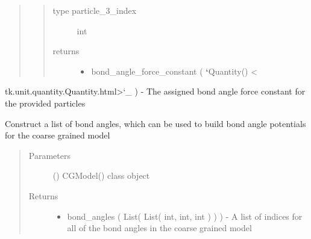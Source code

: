 \documentclass[letterpaper,12pt,english,openany,oneside]{sphinxmanual}
\begin{document}
\begin{fulllineitems}
\begin{fulllineitems}
\begin{quote}
\begin{quote}
\begin{description}
\item[{type particle\_3\_index}] \leavevmode
int

\item[{returns}] \leavevmode\begin{itemize}
\item {} 
bond\_angle\_force\_constant ( {\color{red}\bfseries{}{}`}Quantity() \textless{}

\end{itemize}

\end{description}\end{quote}
\end{quote}

tk.unit.quantity.Quantity.html\textgreater{}{}`\_ ) - The assigned bond angle force constant for the provided particles

\end{fulllineitems}


\begin{fulllineitems}
\label{\detokenize{cg_model:cg_model.cgmodel.CGModel.get_bond_angle_list}}
Construct a list of bond angles, which can be used to build bond angle potentials for the coarse grained model
\begin{quote}\begin{description}
\item[{Parameters}] \leavevmode
{} () \textendash{} CGModel() class object

\item[{Returns}] \leavevmode
\begin{itemize}
\item {} 
bond\_angles ( List( List( int, int, int ) ) ) - A list of indices for all of the bond angles in the coarse grained model

\end{itemize}


\end{description}\end{quote}

\end{fulllineitems}


\end{fulllineitems}
\end{document}
